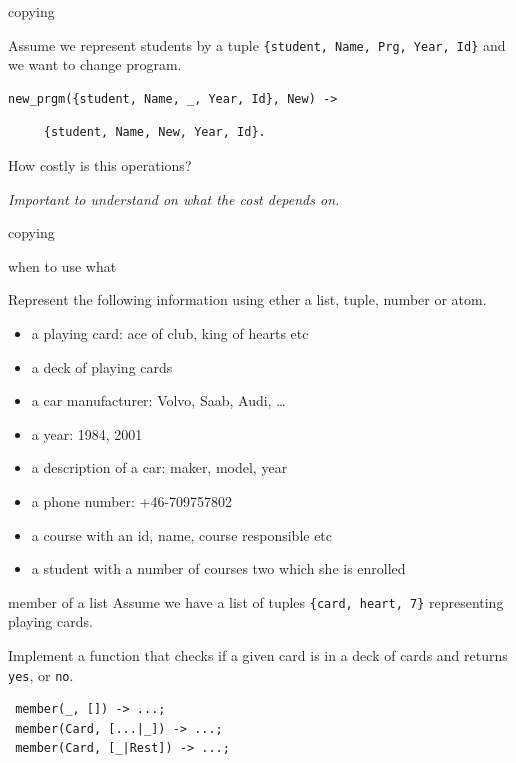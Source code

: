 \begin{frame}[fragile]{copying}

Assume we represent students by a tuple {\tt \{student, Name, Prg, Year, Id\}} and we want to change program.

\pause
\begin{verbatim}
new_prgm({student, Name, _, Year, Id}, New) -> \end{verbatim}\pause\begin{verbatim}
     {student, Name, New, Year, Id}.
\end{verbatim}

\pause

How costly is this operations?

\vspace{10pt}
{\em Important to understand on what the cost depends on.}

\end{frame}


\begin{frame}{copying}

\end{frame}

\begin{frame}{when to use what}

Represent the following information using ether a list, tuple, number or atom.
                   
\begin{itemize}
\item a playing card: ace of club, king of hearts etc
\item a deck of playing cards
\item a car manufacturer: Volvo, Saab, Audi, \ldots
\item a year: 1984, 2001
\item a description of a car: maker, model, year
\item a phone number: +46-709757802
\item a course with an id, name, course responsible etc
\item a student with a number of courses two which she is enrolled
\end{itemize}

\end{frame}

\begin{frame}[fragile]{member of a list}
Assume we have a list of tuples {\tt \{card, heart, 7\}} representing playing cards. 
\pause

\vspace{10pt}
Implement a function that checks if a given card is in a deck of cards and returns {\tt yes}, or {\tt no}.

\begin{verbatim}
 member(_, []) -> ...;
 member(Card, [...|_]) -> ...;
 member(Card, [_|Rest]) -> ...;
\end{verbatim}

\end{frame}


